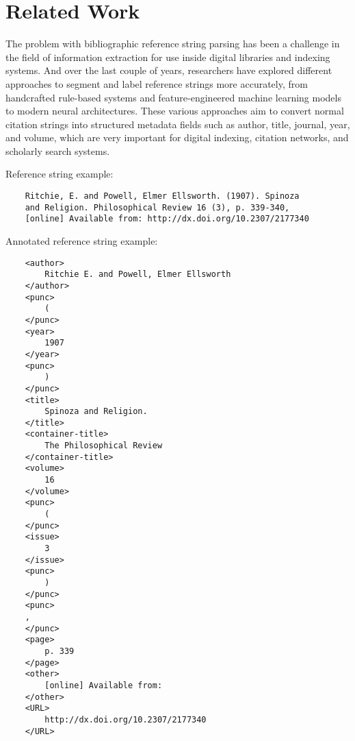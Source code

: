 \chapter{Related Work}
\label{ch:related}

The problem with bibliographic reference string parsing has been a challenge in the field of information extraction for use inside digital libraries and indexing systems. And over the last couple of years, researchers have explored different approaches to segment and label reference strings more accurately, from handcrafted rule-based systems and feature-engineered machine learning models to modern neural architectures. These various approaches aim to convert normal citation strings into structured metadata fields such as author, title, journal, year, and volume, which are very important for digital indexing, citation networks, and scholarly search systems.

Reference string example:
\begin{verbatim}
    Ritchie, E. and Powell, Elmer Ellsworth. (1907). Spinoza 
    and Religion. Philosophical Review 16 (3), p. 339-340, 
    [online] Available from: http://dx.doi.org/10.2307/2177340
\end{verbatim}
Annotated reference string example:
\begin{verbatim}
    <author>
        Ritchie E. and Powell, Elmer Ellsworth
    </author>
    <punc>
        (
    </punc>
    <year>
        1907
    </year>
    <punc>
        )
    </punc>
    <title>
        Spinoza and Religion.
    </title>
    <container-title>
        The Philosophical Review
    </container-title>
    <volume>
        16
    </volume>
    <punc>
        (
    </punc>
    <issue>
        3
    </issue>
    <punc>
        )
    </punc>
    <punc>
    ,
    </punc> 
    <page>
        p. 339
    </page>
    <other>
        [online] Available from:
    </other>
    <URL>
        http://dx.doi.org/10.2307/2177340
    </URL>
\end{verbatim}

